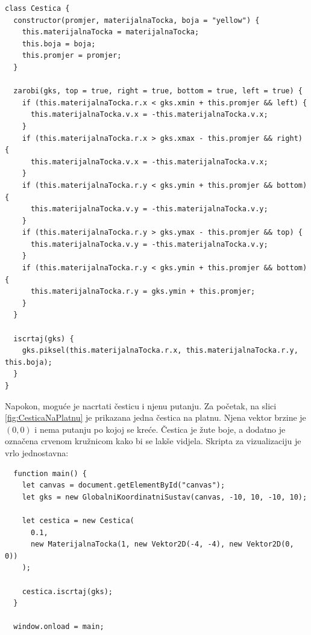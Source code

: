 \documentclass{foi}
\begin{document}
\begin{verbatim}
class Cestica {
  constructor(promjer, materijalnaTocka, boja = "yellow") {
    this.materijalnaTocka = materijalnaTocka;
    this.boja = boja;
    this.promjer = promjer;
  }

  zarobi(gks, top = true, right = true, bottom = true, left = true) {
    if (this.materijalnaTocka.r.x < gks.xmin + this.promjer && left) {
      this.materijalnaTocka.v.x = -this.materijalnaTocka.v.x;
    }
    if (this.materijalnaTocka.r.x > gks.xmax - this.promjer && right) {
      this.materijalnaTocka.v.x = -this.materijalnaTocka.v.x;
    }
    if (this.materijalnaTocka.r.y < gks.ymin + this.promjer && bottom) {
      this.materijalnaTocka.v.y = -this.materijalnaTocka.v.y;
    }
    if (this.materijalnaTocka.r.y > gks.ymax - this.promjer && top) {
      this.materijalnaTocka.v.y = -this.materijalnaTocka.v.y;
    }
    if (this.materijalnaTocka.r.y < gks.ymin + this.promjer && bottom) {
      this.materijalnaTocka.r.y = gks.ymin + this.promjer;
    }
  }

  iscrtaj(gks) {
    gks.piksel(this.materijalnaTocka.r.x, this.materijalnaTocka.r.y, this.boja);
  }
}
\end{verbatim}
Napokon, moguće je nacrtati česticu i njenu putanju. Za početak, na slici \ref{fig:CesticaNaPlatnu} je prikazana jedna čestica na platnu. Njena vektor brzine je $(0, 0)$ i nema putanju po kojoj se kreće. Čestica je žute boje, a dodatno je označena crvenom kružnicom kako bi se lakše vidjela. Skripta za vizualizaciju je vrlo jednostavna:

\begin{verbatim}
  function main() {
    let canvas = document.getElementById("canvas");
    let gks = new GlobalniKoordinatniSustav(canvas, -10, 10, -10, 10);

    let cestica = new Cestica(
      0.1,
      new MaterijalnaTocka(1, new Vektor2D(-4, -4), new Vektor2D(0, 0))
    );

    cestica.iscrtaj(gks);
  }

  window.onload = main;
\end{verbatim}
\end{document}
